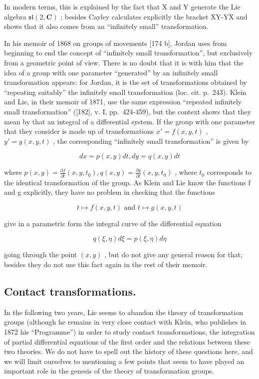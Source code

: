 In modern terms, this is explained by the fact that X and Y generate the Lie algebra \(\mathfrak{sl}(2,\mathbf{C})\) ; besides Cayley calculates explicitly the bracket XY-YX and shows that it also comes from an ``infinitely small'' transformation.

In his memoir of 1868 on groups of movements {[}174 b{]}, Jordan uses from beginning to end the concept of ``infinitely small transformation'', but exclusively from a geometric point of view. There is no doubt that it is with him that the idea of a group with one parameter ``generated'' by an infinitely small transformation appears: for Jordan, it is the set of transformations obtained by ``repeating suitably'' the infinitely small transformation (loc. cit. p.~243). Klein and Lie, in their memoir of 1871, use the same expression ``repeated infinitely small transformation'' ({[}182{]}, v. I, pp.~424-459), but the context shows that they mean by that an integral of a differential system. If the group with one parameter that they consider is made up of transformations \(x' = f(x, y, t)\) , \(y' = g(x, y, t)\) , the corresponding ``infinitely small transformation'' is given by

\[
d x = p (x, y) d t, d y = q (x, y) d t
\]

where \(p(x,y)=\frac{\partial f}{\partial t}(x,y,t_{0}),q(x,y)=\frac{\partial g}{\partial t}(x,y,t_{0})\) , where \(t_{0}\) corresponds to the identical transformation of the group. As Klein and Lie know the functions f and g explicitly, they have no problem in checking that the functions

\[
t \mapsto f (x, y, t) \text {   and   } t \mapsto g (x, y, t)
\]

give in a parametric form the integral curve of the differential equation

\[
q (\xi , \eta) d \xi = p (\xi , \eta) d \eta
\]

going through the point \((x,y)\) , but do not give any general reason for that; besides they do not use this fact again in the rest of their memoir.

\subsection{Contact transformations.}

In the following two years, Lie seems to abandon the theory of transformation groups (although he remains in very close contact with Klein, who publishes in 1872 his ``Programme'') in order to study contact transformations, the integration of partial differential equations of the first order and the relations between these two theories. We do not have to spell out the history of these questions here, and we will limit ourselves to mentioning a few points that seem to have played an important role in the genesis of the theory of transformation groups.

